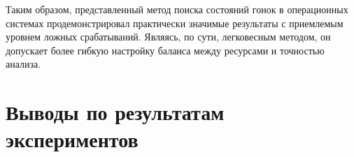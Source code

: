Таким   образом,   представленный   метод   поиска  состояний  гонок в операционных системах продемонстрировал практически значимые результаты
с приемлемым уровнем ложных срабатываний.
Являясь, по сути, легковесным методом, он допускает более гибкую настройку баланса между ресурсами и точностью анализа.


\section{Выводы по результатам экспериментов}



\clearpage